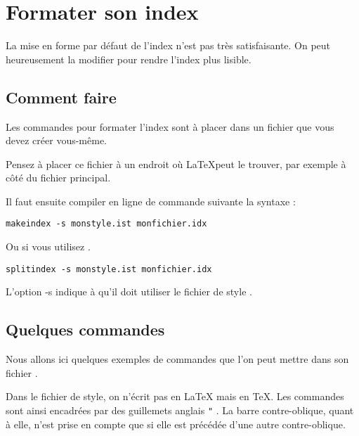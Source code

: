 \chapter{Formater son index}

\begin{prealable}
La mise en forme par défaut de l'index n'est pas très satisfaisante. On peut heureusement la modifier pour rendre l'index plus lisible.
\end{prealable}

\section{Comment faire}
Les commandes pour formater l'index sont à placer dans un fichier  que vous devez créer vous-même.

\begin{attention}
Pensez à placer ce fichier à un endroit où \LaTeX peut le trouver, par exemple à côté du fichier principal.
\end{attention}

Il faut ensuite compiler en ligne de commande suivante la syntaxe :
\begin{verbatim}
makeindex -s monstyle.ist monfichier.idx
\end{verbatim}

Ou si vous utilisez .

\begin{verbatim}
splitindex -s monstyle.ist monfichier.idx
\end{verbatim}

L'option -s indique à   qu'il doit utiliser le fichier de style .

\section{Quelques commandes}

Nous allons ici quelques exemples de commandes que l'on peut mettre dans son fichier . 

\begin{attention}
Dans le fichier de style, on n'écrit pas en \LaTeX{} mais en \TeX . Les commandes sont ainsi encadrées par des guillemets anglais \verb|"| . La barre contre-oblique, quant à elle, n'est prise en compte que si elle est précédée d'une autre contre-oblique.
\end{attention}


